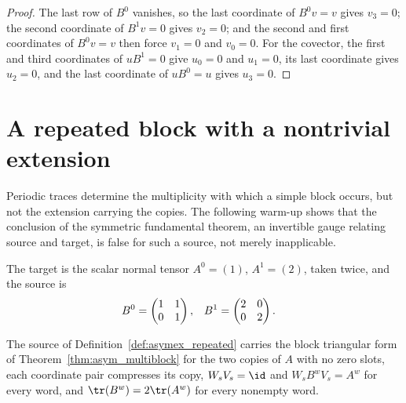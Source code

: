 \begin{proof}
    \leanok
    The last row of $B^0$ vanishes, so the last coordinate of $B^0v=v$
    gives $v_3=0$; the second coordinate of $B^1v=0$ gives $v_2=0$; and the
    second and first coordinates of $B^0v=v$ then force $v_1=0$ and
    $v_0=0$. For the covector, the first and third coordinates of $uB^1=0$
    give $u_0=0$ and $u_1=0$, its last coordinate gives $u_2=0$, and the
    last coordinate of $uB^0=u$ gives $u_3=0$.
\end{proof}

\section{A repeated block with a nontrivial extension}%
\label{sec:asymex_repeated}

Periodic traces determine the multiplicity with which a simple block occurs,
but not the extension carrying the copies. The following warm-up shows that
the conclusion of the symmetric fundamental theorem, an invertible gauge
relating source and target, is false for such a source, not merely
inapplicable.

\begin{definition}
    \label{def:asymex_repeated}
    \leanok
    The target is the scalar normal tensor $A^0=(1)$, $A^1=(2)$, taken
    twice, and the source is
    \begin{align}
        B^0
         & =\begin{pmatrix}1&1\\0&1\end{pmatrix},
         &
        B^1
         & =\begin{pmatrix}2&0\\0&2\end{pmatrix}.
        \notag
    \end{align}
\end{definition}

\begin{theorem}
    \label{thm:asymex_repeated_compression}
    \leanok
    The source of Definition~\ref{def:asymex_repeated} carries the block
    triangular form of Theorem~\ref{thm:asym_multiblock} for the two copies
    of $A$ with no zero slots, each coordinate pair compresses its copy,
    $W_sV_s=\id$ and $W_sB^wV_s=A^w$ for every word, and
    $\tr(B^w)=2\tr(A^w)$ for every nonempty word.
\end{theorem}

